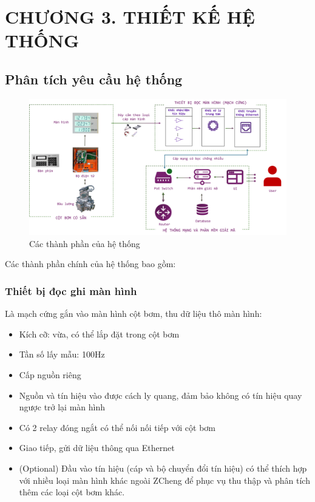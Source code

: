 \section*{CHƯƠNG 3. THIẾT KẾ HỆ THỐNG}
    
\setcounter{section}{3}
    \setcounter{subsection}{0}
        \setcounter{figure}{0}
            \setcounter{table}{0}

\subsection{Phân tích yêu cầu hệ thống}


\begin{figure}[!ht]
    \centering
    \includegraphics[width=1.0\linewidth]{Figures/Chap3_FunctionBlock-implementation.png}
    \caption{Các thành phần của hệ thống}
    \label{fig:hinh3.1}
\end{figure}

Các thành phần chính của hệ thống bao gồm:

\subsubsection{Thiết bị đọc ghi màn hình}


Là mạch cứng gắn vào màn hình cột bơm, thu dữ liệu thô màn hình:
\begin{itemize}
   
    \item Kích cỡ: vừa, có thể lắp đặt trong cột bơm
    \item Tần số lấy mẫu: 100Hz
    \item Cấp nguồn riêng
    \item Nguồn và tín hiệu vào được cách ly quang, đảm bảo không có tín hiệu quay ngược trở lại màn hình
    \item Có 2 relay đóng ngắt có thể nối nối tiếp với cột bơm
    \item Giao tiếp, gửi dữ liệu thông qua Ethernet
    \item (Optional) Đầu vào tín hiệu (cáp và bộ chuyển đổi tín hiệu) có thể thích hợp với nhiều loại màn hình khác ngoài ZCheng để phục vụ thu thập và phân tích thêm các loại cột bơm khác.
    
\end{itemize}




